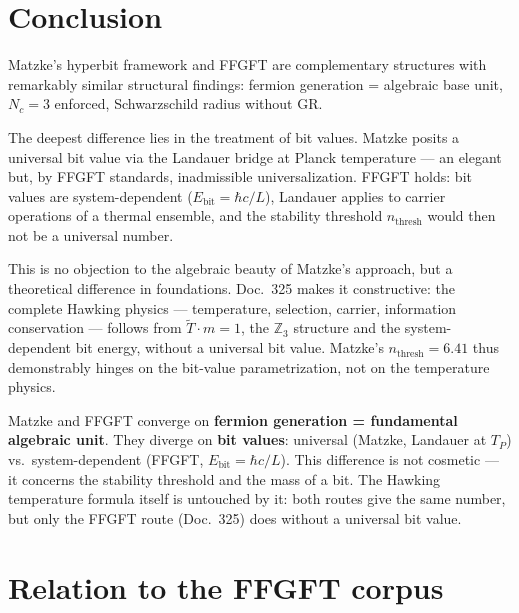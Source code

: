 \section*{Conclusion}

Matzke's hyperbit framework and FFGFT are complementary structures with
remarkably similar structural findings: fermion generation = algebraic
base unit, $N_c = 3$ enforced, Schwarzschild radius without GR.

The deepest difference lies in the treatment of bit values.
Matzke posits a universal bit value via the Landauer bridge at Planck
temperature — an elegant but, by FFGFT standards, inadmissible
universalization. FFGFT holds: bit values are system-dependent
($E_{\mathrm{bit}} = \hbar c/L$), Landauer applies to carrier
operations of a thermal ensemble, and the stability threshold
$n_{\mathrm{thresh}}$ would then not be a universal number.

This is no objection to the algebraic beauty of Matzke's approach,
but a theoretical difference in foundations.
Doc.\ 325 makes it constructive: the complete Hawking physics —
temperature, selection, carrier, information conservation — follows
from $\tilde{T}\cdot m = 1$, the $\mathbb{Z}_3$ structure and the
system-dependent bit energy, without a universal bit value.
Matzke's $n_{\mathrm{thresh}} = 6.41$ thus demonstrably hinges on the
bit-value parametrization, not on the temperature physics.

\begin{tcolorbox}[ffgftbox, title={Main finding}]
  Matzke and FFGFT converge on \textbf{fermion generation = fundamental
  algebraic unit}. They diverge on \textbf{bit values}: universal
  (Matzke, Landauer at $T_P$) vs.\ system-dependent (FFGFT,
  $E_{\mathrm{bit}} = \hbar c/L$).
  This difference is not cosmetic — it concerns the stability threshold
  and the mass of a bit. The Hawking temperature formula itself is
  untouched by it: both routes give the same number, but only the FFGFT
  route (Doc.\ 325) does without a universal bit value.
\end{tcolorbox}

\section*{Relation to the FFGFT corpus}


